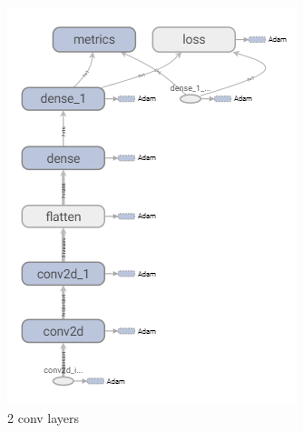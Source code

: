 \begin{figure}[H]
	\centering
	\begin{subfigure}[b]{0.3\linewidth}
		\includegraphics[width=\linewidth]{plots/cnn-candidates-2-conv.png}
		\caption{2 conv layers}
	\end{subfigure}
	\begin{subfigure}[b]{0.3\linewidth}

\end{subfigure}
\end{figure}
